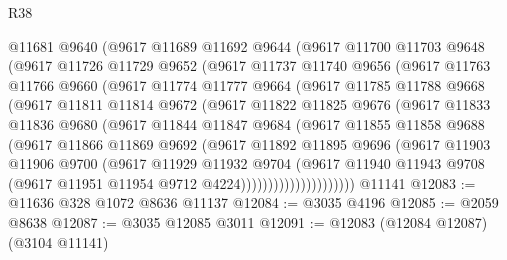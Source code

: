 \begin{lexlean}{R38}
\begin{coremodule}
          @11681
          @9640
          (@9617
            @11689
            @11692
            @9644
            (@9617
              @11700
              @11703
              @9648
              (@9617
                @11726
                @11729
                @9652
                (@9617
                  @11737
                  @11740
                  @9656
                  (@9617
                    @11763
                    @11766
                    @9660
                    (@9617
                      @11774
                      @11777
                      @9664
                      (@9617
                        @11785
                        @11788
                        @9668
                        (@9617
                          @11811
                          @11814
                          @9672
                          (@9617
                            @11822
                            @11825
                            @9676
                            (@9617
                              @11833
                              @11836
                              @9680
                              (@9617
                                @11844
                                @11847
                                @9684
                                (@9617
                                  @11855
                                  @11858
                                  @9688
                                  (@9617
                                    @11866
                                    @11869
                                    @9692
                                    (@9617
                                      @11892
                                      @11895
                                      @9696
                                      (@9617
                                        @11903
                                        @11906
                                        @9700
                                        (@9617
                                          @11929
                                          @11932
                                          @9704
                                          (@9617
                                            @11940
                                            @11943
                                            @9708
                                            (@9617 @11951 @11954 @9712 @4224)))))))))))))))))))))
    @11141
@12083 := @11636 @328 @1072 @8636 @11137
@12084 := @3035 @4196
@12085 := @2059 @8638
@12087 := @3035 @12085 @3011
@12091 := @12083 (@12084 @12087) (@3104 @11141)

\end{coremodule}
\end{lexlean}
